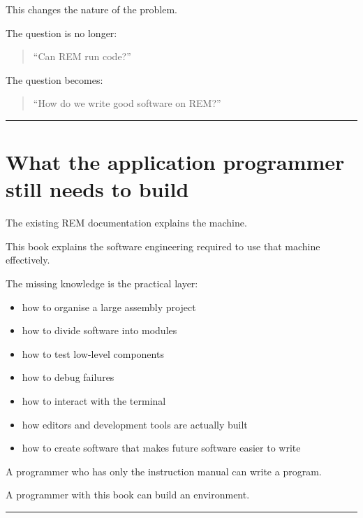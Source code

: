 \documentclass[
  oneside,
  openany]{book}
\providecommand{\tightlist}{%
  \setlength{\itemsep}{0pt}\setlength{\parskip}{0pt}}
\begin{document}
This changes the nature of the problem.

The question is no longer:

\begin{quote}
``Can REM run code?''
\end{quote}

The question becomes:

\begin{quote}
``How do we write good software on REM?''
\end{quote}

\begin{center}\rule{0.5\linewidth}{0.5pt}\end{center}

\hypertarget{what-the-application-programmer-still-needs-to-build}{%
\section{What the application programmer still needs to
build}\label{what-the-application-programmer-still-needs-to-build}}

The existing REM documentation explains the machine.

This book explains the software engineering required to use that machine
effectively.

The missing knowledge is the practical layer:

\begin{itemize}
\tightlist
\item
  how to organise a large assembly project
\item
  how to divide software into modules
\item
  how to test low-level components
\item
  how to debug failures
\item
  how to interact with the terminal
\item
  how editors and development tools are actually built
\item
  how to create software that makes future software easier to write
\end{itemize}

A programmer who has only the instruction manual can write a program.

A programmer with this book can build an environment.

\begin{center}\rule{0.5\linewidth}{0.5pt}\end{center}
\end{document}
